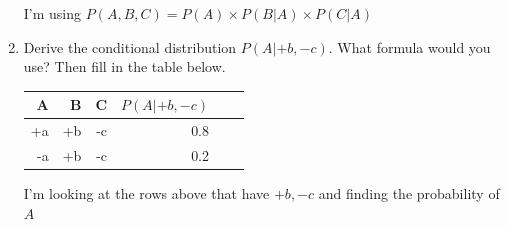 \documentclass[12pt]{article}
\begin{document}
\begin{enumerate}
I'm using $P(A,B,C) = P(A) \times P(B|A) \times P(C|A)$

\item Derive the conditional distribution $P(A|+b,-c)$.  What formula
  would you use?  Then fill in the table below.

\begin{center}
\begin{tabular}{|r|r|r|r|l|l|} \hline
A  & B  & C  & $P(A|+b,-c)$ \\ \hline
+a & +b & -c & 0.8             \\ \hline
-a & +b & -c & 0.2             \\ \hline
\end{tabular}
\end{center}

I'm looking at the rows above that have $+b, -c$ and finding the probability of $A$

\end{enumerate}
\end{document}
